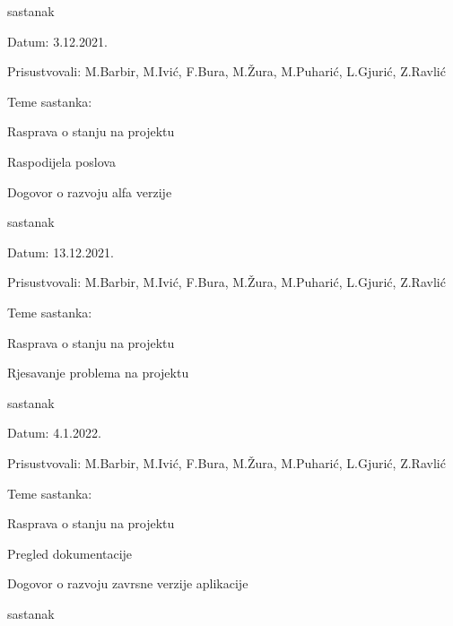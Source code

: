\begin{packed_enum}
			\item  sastanak
			\item[] \begin{packed_item}
				\item Datum: 3.12.2021.
				\item Prisustvovali: M.Barbir, M.Ivić, F.Bura, M.Žura, M.Puharić, L.Gjurić, Z.Ravlić
				\item Teme sastanka:
				\begin{packed_item}
					\item  Rasprava o stanju na projektu
					\item  Raspodijela poslova
					\item  Dogovor o razvoju alfa verzije 
				\end{packed_item}
			\end{packed_item}
		\item  sastanak
		\item[] \begin{packed_item}
			\item Datum: 13.12.2021.
			\item Prisustvovali: M.Barbir, M.Ivić, F.Bura, M.Žura, M.Puharić, L.Gjurić, Z.Ravlić
			\item Teme sastanka:
			\begin{packed_item}
				\item  Rasprava o stanju na projektu
				\item Rjesavanje problema na projektu
			\end{packed_item}
		\end{packed_item}
	\item  sastanak
	\item[] \begin{packed_item}
		\item Datum: 4.1.2022.
		\item Prisustvovali: M.Barbir, M.Ivić, F.Bura, M.Žura, M.Puharić, L.Gjurić, Z.Ravlić
		\item Teme sastanka:
		\begin{packed_item}
			\item  Rasprava o stanju na projektu
			\item  Pregled dokumentacije
			\item  Dogovor o razvoju zavrsne verzije aplikacije
		\end{packed_item}
	\end{packed_item}
\item  sastanak
\item[] \begin{packed_item}

\end{packed_item}
\end{packed_enum}
